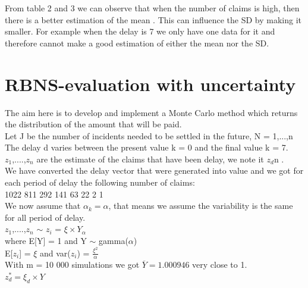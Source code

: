 \documentclass[a4paper]{article}
\begin{document}
From table 2 and 3 we can observe that when the number of claims is high, then there is a better estimation of the mean . This can influence the SD by making it smaller. For example when the delay is 7 we only have one data for it and therefore cannot make a good estimation of either the mean nor the SD.  







 

\section{ RBNS-evaluation with uncertainty} 


The aim here is to develop and implement a Monte Carlo method which returns the distribution of the amount that will be paid. \\

Let J be the  number of incidents needed to be settled in the future, N = 1,...,n\\

The delay d varies between the present value k = 0 and the final value k = 7.   \\
$z_1$,....,$z_n$ are the estimate of the claims that have been delay, we note it $z_d$n .  \\
We have converted the delay vector that were generated into value and we got for each period of delay the following number of claims:\\
1022  811  292  141   63   22    2    1  \\
 

                 
We now assume that  $ \alpha_k  =  \alpha $, that means we assume the variability is the same for all period of delay.\\

$z_1$,....,$z_n$ $\sim$ $z_i$ = $\xi  \times  Y_\alpha$ \\
where E[Y] = 1  and  Y $\sim$ gamma($\alpha$)  \\

E[$z_i$] = $\xi$  and var($z_i$) = $\frac{\xi^2}{\alpha}$ \\  

With m = 10 000 simulations we got $\overline{Y} = 1.000946 $ very close to 1.\\
$z_d^* = \xi_d \times Y$
\end{document}
